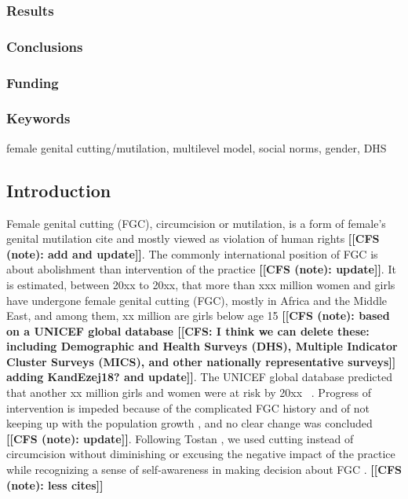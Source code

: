 \documentclass[12pt,]{article}
\newcommand{\comment}[1]{\textbf{[[#1]]}}
\newcommand{\cfcmt}[1]{\comment{CFS: #1}}
\newcommand{\cfonly}[1]{\comment{CFS (note): #1}}
\begin{document}
\subsubsection{Results}\label{results}

\subsubsection{Conclusions}\label{conclusions}

\subsubsection{Funding}\label{funding}

\subsubsection{Keywords}\label{keywords}

female genital cutting/mutilation, multilevel model, social norms, gender, DHS

\subsection{Introduction}\label{introduction}

Female genital cutting (FGC), circumcision or mutilation, is a form of female's genital mutilation cite{} and mostly viewed as violation of human rights \cite{WHO97, WHO08} \cfonly{add and update}.  The commonly international position of FGC is about abolishment than intervention of the practice \cite{KhosBane17, Mack96, Toub94, UNIC16, WHO97}\cfonly{update}.  It is estimated, between 20xx to 20xx, that more than xxx million women and girls have undergone female genital cutting (FGC), mostly in Africa and the Middle East, and among them, xx million are girls below age 15 \cfonly{based on a UNICEF global database \cite{AdnrLesc16, UNIC16} \cfcmt{I think we can delete these: including Demographic and Health Surveys (DHS), Multiple Indicator Cluster Surveys (MICS), and other nationally representative surveys} adding KandEzej18? and update}.  The UNICEF global database predicted that another xx million girls and women were at risk by 20xx  \cite{AdnrLesc16, UNIC16, update}.  Progress of intervention is impeded because of the complicated FGC history \cite{BergDeni12, Cami16} and of not keeping up with the population growth \cite{KhosBane17, UNIC16}, and no clear change was concluded \cite{KandShel19} \cfonly{update}.  Following Tostan \cite{Tost15}, we used cutting instead of circumcision without diminishing or excusing the negative impact of the practice while recognizing a sense of self-awareness in making decision about FGC \cite{KhahBark09, JohnEsse10, Meye00, PariSaru18, Shel01, Tost15}. \cfonly{less cites}
\end{document}
